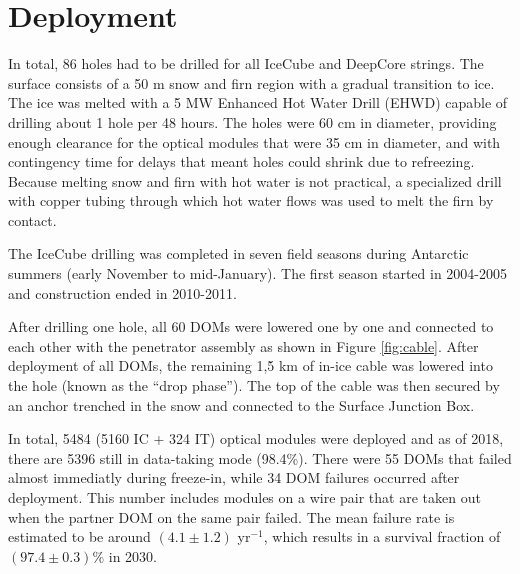 \section{Deployment}
\label{sec:deployment}
In total, 86 holes had to be drilled for all IceCube and DeepCore strings. The surface consists of a 50 m snow and firn region with a gradual transition to ice. The ice was melted with a 5 MW Enhanced Hot Water Drill (EHWD) capable of drilling about 1 hole per 48 hours. The holes were 60 cm in diameter, providing enough clearance for the optical modules that were 35 cm in diameter, and with contingency time for delays that meant holes could shrink due to refreezing. Because melting snow and firn with hot water is not practical, a specialized drill with copper tubing through which hot water flows was used to melt the firn by contact.

The IceCube drilling was completed in seven field seasons during Antarctic summers (early November to mid-January). The first season started in 2004-2005 and construction ended in 2010-2011. 

After drilling one hole, all 60 DOMs were lowered one by one and connected to each other with the penetrator assembly as shown in Figure \ref{fig:cable}. After deployment of all DOMs, the remaining 1,\.5 km of in-ice cable was lowered into the hole (known as the ``drop phase''). The top of the cable was then secured by an anchor trenched in the snow and connected to the Surface Junction Box. 

In total, 5484 (5160 IC + 324 IT) optical modules were deployed and as of 2018, there are 5396 still in data-taking mode (98.4\%). There were 55 DOMs that failed almost immediatly during freeze-in, while 34 DOM failures occurred after deployment. This number includes modules on a wire pair that are taken out when the partner DOM on the same pair failed. The mean failure rate is estimated to be around $(4.1 \pm 1.2)$ yr$^{-1}$, which results in a survival fraction of $(97.4 \pm 0.3)\%$ in 2030.


